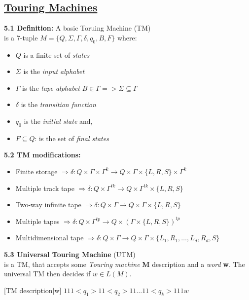\documentclass{article}
\begin{document}
\begin{multicols}{2}
\section{\underline{Touring Machines}}

\textbf{5.1 Definition:} A basic Toruing Machine (TM)\\
is a 7-tuple $M = \{Q, \Sigma, \Gamma, \delta, q_0, B, F\}$ where:
\begin{itemize}
    \setlength\itemsep{-0.4em}
    \item $Q$ is a finite set of \textit{states}
    \item $\Sigma$ is the \textit{input alphabet} 
    \item $\Gamma$ is the \textit{tape alphabet} \small{$B \in \Gamma => \Sigma \subseteq \Gamma$}
    \item $\delta$ is the \textit{transition function}
    \item $q_0$ is the \textit{initial state} and,
    \item $F \subseteq Q$: is the set of \textit{final states}
\end{itemize}

\textbf{5.2 TM modifications:}\\
\begin{itemize}
    \setlength\itemsep{-0.4em}
    \item Finite storage $\Rightarrow \delta: Q \times \Gamma \times \Gamma^k \rightarrow Q \times \Gamma \times \{L, R, S\} \times \Gamma^k$
    \item Multiple track tape $\Rightarrow \delta: Q \times  \Gamma^{tk} \rightarrow Q \times \Gamma^{tk} \times \{L, R, S\}$
    \item Two-way infinite tape $\Rightarrow \delta: Q \times  \Gamma \rightarrow Q \times \Gamma \times \{L, R, S\}$
    \item Multiple tapes $\Rightarrow \delta: Q \times  \Gamma^{tp} \rightarrow Q \times (\Gamma \times \{L, R, S\})^{tp}$
    \item Multidimensional tape $\Rightarrow \delta: Q \times  \Gamma \rightarrow Q \times \Gamma \times \{L_1, R_1, \dots, L_d, R_d, S\}$
\end{itemize}

\textbf{5.3 Universal Touring Machine} (UTM)\\
is a TM, that accepts some \textit{Touring machine} \textbf{M} description and a \textit{word} \textbf{w}. 
The universal TM then decides if $w \in L(M)$.\smallskip

[TM description$|$w]
$111<q_1>11<q_2>11\dots11<q_k>111w$ \smallskip


\end{multicols}
\end{document}
